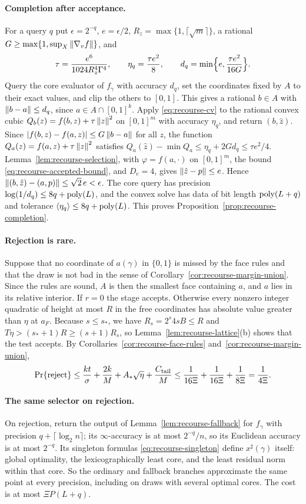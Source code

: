 \paragraph{Completion after acceptance.}
For a query $q$ put $\epsilon=2^{-q}$, $e=\epsilon/2$,
$R_z=\max\{1,\lceil\sqrt m\rceil\}$, a rational
$G\ge\max\{1,\sup_X\left\lVert\nabla_vf\right\rVert\}$, and
\[
 \tau=\frac{e^6}{1024R_z^4\Gamma^4},\qquad
 \eta_q=\frac{\tau e^2}8,\qquad
 d_q=\min\Bigl\{e,\frac{\tau e^2}{16G}\Bigr\}.
\]
Query the core evaluator of $f_\gamma$ with accuracy $d_q$, set the
coordinates fixed by $A$ to their exact values, and clip the others to
$[0,1]$. This gives a rational $b\in A$ with $\left\lVert b-a\right\rVert\le d_q$, since
$a\in A\cap[0,1]^k$. Apply \eqref{eq:recourse-cv} to the rational convex
cubic $Q_b(z)=f(b,z)+\tau\left\lVert z\right\rVert^2$ on $[0,1]^m$ with accuracy $\eta_q$,
and return $(b,\hat z)$. Since $\left\lvert f(b,z)-f(a,z)\right\rvert\le G\left\lVert b-a\right\rVert$ for
all $z$, the function $Q_a(z)=f(a,z)+\tau\left\lVert z\right\rVert^2$ satisfies
$Q_a(\hat z)-\min Q_a\le\eta_q+2Gd_q\le\tau e^2/4$.
Lemma~\ref{lem:recourse-selection}, with $\varphi=f(a,\cdot)$ on
$[0,1]^m$, the bound \eqref{eq:recourse-accepted-bound}, and $D_e=4$,
gives $\left\lVert\hat z-p\right\rVert\le e$. Hence
$\left\lVert(b,\hat z)-(a,p)\right\rVert\le\sqrt2\,e<\epsilon$. The core query has
precision $\log(1/d_q)\le8q+\operatorname{poly}(L)$, and the convex solve has data of
bit length $\operatorname{poly}(L+q)$ and tolerance $\langle\eta_q\rangle\le8q+\operatorname{poly}(L)$.
This proves
Proposition~\ref{prop:recourse-completion}.

\paragraph{Rejection is rare.}
Suppose that no coordinate of $a(\gamma)$ in $\{0,1\}$ is missed by the
face rules and that the draw is not bad in the sense of
Corollary~\ref{cor:recourse-margin-union}. Since the rules are sound,
$A$ is then the smallest face containing $a$, and $a$ lies in its
relative interior. If $r=0$ the stage accepts. Otherwise every nonzero
integer quadratic of height at most $R$ in the free coordinates has
absolute value greater than $\eta$ at $a_F$. Because $s\le s_*$, we have
$R_s=2^s4sB\le R$ and $T\eta>(s_*+1)R\ge(s+1)R_s$, so
Lemma~\ref{lem:recourse-lattice}(b) shows that the test accepts. By
Corollaries~\ref{cor:recourse-face-rules}
and~\ref{cor:recourse-margin-union},
\[
 \Pr\{\text{reject}\}\le\frac{kt}\sigma+\frac{2k}M+A_*\sqrt\eta
 +\frac{C_{\rm tail}}M\le\frac1{16\Xi}+\frac1{16\Xi}+\frac1{8\Xi}
 =\frac1{4\Xi}.
\]

\paragraph{The same selector on rejection.}
On rejection, return the output of Lemma~\ref{lem:recourse-fallback} for
$f_\gamma$ with precision $q+\lceil\log_2n\rceil$; its $\infty$-accuracy
is at most $2^{-q}/n$, so its Euclidean accuracy is at most $2^{-q}$.
Its singleton formulas
\eqref{eq:recourse-singleton} define $x^\sharp(\gamma)$ itself: global
optimality, the lexicographically least core, and the least residual
norm within that core. So the ordinary and fallback branches approximate
the same point at every precision, including on draws with several
optimal cores. The cost is at most $\Xi P(L+q)$.

